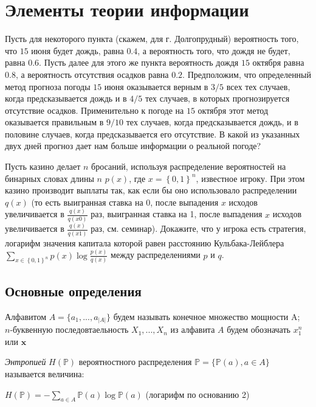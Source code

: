 \section{Элементы теории информации}

\begin{problem}
Пусть для некоторого пункта (скажем, для г. Долгопрудный) 
вероятность того, что $15$ июня будет дождь, равна $0.4$, а вероятность того, 
что дождя не будет, равна $0.6$. Пусть далее для этого же пункта вероятность 
дождя $15$ октября равна $0.8$, а вероятность отсутствия осадков равна $0.2$. 
Предположим, что определенный метод прогноза погоды $15$ июня оказывается 
верным в $3/5$ всех тех случаев, когда предсказывается дождь 
и в $4/5$ тех случаев, в которых прогнозируется отсутствие осадков. Применительно к 
погоде на $15$ октября этот метод оказывается правильным в $9/10$ тех случаев, 
когда предсказывается дождь, и в половине случаев, когда предсказывается его 
отсутствие. В какой из указанных двух дней прогноз дает нам больше 
информации о реальной погоде?
\end{problem}

\begin{problem}

Пусть казино делает $n$ бросаний, используя распределение вероятностей на бинарных словах длины $n$ $p\left(x\right)$, где $x=\left\{0,1\right\}^{n} $, известное игроку. При этом казино производит выплаты так, как если бы оно использовало распределении $q\left(x\right)$ (то есть выигранная ставка на 0, после выпадения $x$ исходов увеличивается в $\frac{q\left(x\right)}{q\left(x0\right)} $ раз, выигранная ставка на 1, после выпадения $x$ исходов увеличивается в $\frac{q\left(x\right)}{q\left(x1\right)} $ раз, см. семинар). Докажите, что у игрока есть стратегия, логарифм значения капитала которой равен расстоянию Кульбака-Лейблера $\sum _{x\in \left\{0,1\right\}^{n} }p\left(x\right)\log \frac{p\left(x\right)}{q\left(x\right)}  $ между распределениями $p$ и $q$.
\end{problem}


\subsection{Основные определения}
Алфавитом $A = \{a_1, ..., a_{|A|}\}$ будем называть конечное множество мощности A;\\
$n$-буквенную последовтаельность $X_1, ..., X_n$ из алфавита $A$ будем обозначать $x_1^n$ или $\textbf{x}$


\begin{definition} 
\textit{Энтропией} $H(\mathbb{P})$ вероятностного распределения $\mathbb{P} = \{\mathbb{P}(a), a \in A\}$ называется величина:
\begin{center}
$H(\mathbb{P}) = - \sum_{a \in A} \mathbb{P}(a)\log \mathbb{P}(a)$ (логарифм по основанию 2)
\end{center}
\end{definition}

